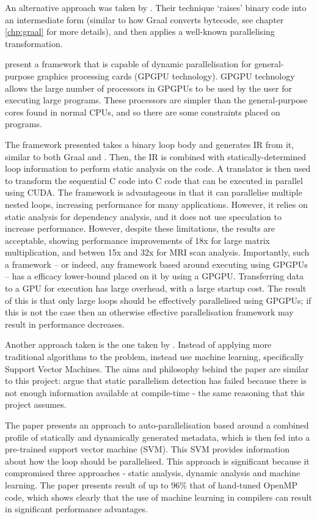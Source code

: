 An alternative approach was taken by \citet{Ketterlin}. Their technique `raises' binary code into an intermediate form (similar to how Graal converts bytecode, see chapter \ref{chp:graal} for more details), and then applies a well-known parallelising transformation.

\citet{Dong} present a framework that is capable of dynamic parallelisation for general-purpose graphics processing cards (GPGPU technology). GPGPU technology allows the large number of processors in GPGPUs to be used by the user for executing large programs. These processors are simpler than the general-purpose cores found in normal CPUs, and so there are some constraints placed on programs.

The framework presented takes a binary loop body and generates IR from it, similar to both Graal and \citet{Ketterlin}. Then, the IR is combined with statically-determined loop information to perform static analysis on the code. A translator is then used to transform the sequential C code into C code that can be executed in parallel using CUDA. The framework is advantageous in that it can parallelise multiple nested loops, increasing performance for many applications. However, it relies on static analysis for dependency analysis, and it does not use speculation to increase performance. However, despite these limitations, the results are acceptable, showing performance improvements of 18x for large matrix multiplication, and betwen 15x and 32x for MRI scan analysis. Importantly, such a framework -- or indeed, any framework based around executing using GPGPUs -- has a efficacy lower-bound placed on it by using a GPGPU. Transferring data to a GPU for execution has large overhead, with a large startup cost. The result of this is that only large loops should be effectively parallelised using GPGPUs; if this is not the case then an otherwise effective parallelisation framework may result in performance decreases.

Another approach taken is the one taken by \citet{Tournavitis2009}. Instead of applying more traditional algorithms to the problem, \citeauthor{Tournavitis2009} instead use machine learning, specifically Support Vector Machines. The aims and philosophy behind the paper are similar to this project: \citeauthor{Tournavitis2009} argue that static parallelism detection has failed because there is not enough information available at compile-time - the same reasoning that this project assumes.

The paper presents an approach to auto-parallelisation based around a combined profile of statically and dynamically generated metadata, which is then fed into a pre-trained support vector machine (SVM). This SVM provides information about how the loop should be parallelised. This approach is significant because it compromised three approaches - static analysis, dynamic analysis and machine learning. The paper presents result of up to 96\% that of hand-tuned OpenMP code, which shows clearly that the use of machine learning in compilers can result in significant performance advantages. 

